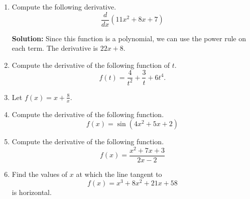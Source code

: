 \documentclass{article}
\begin{document}
\ActivityTitle[class=Calculus I, number=3, name=Differentiation I (Solutions)]

\begin{enumerate}
\item Compute the following derivative. \[ \frac{d}{dx} \left( 11 x^2 + 8 x + 7 \right) \]

\textbf{Solution:}
Since this function is a polynomial, we can use the power rule on each term. The derivative is $22 x + 8$.

  
\vspace{1cm}

\item Compute the derivative of the following function of $t$. \[ f(t) = \frac{4}{t^{2}} + \frac{3}{t} + 6 t^{4}. \]

  
\vspace{1cm}

\item Let $f(x) = x + \frac{8}{x}$.

  
\vspace{1cm}

\item Compute the derivative of the following function. \[ f(x) = \sin(4 x^2 + 5 x + 2) \]

  
\vspace{1cm}

\item Compute the derivative of the following function. \[ f(x) = \frac{x^2 + 7 x + 3}{2 x - 2} \]

  
\vspace{1cm}

\item Find the values of $x$ at which the line tangent to \[ f(x) = x^3 + 8 x^2 + 21 x + 58 \] is horizontal.

  
\vspace{1cm}
\end{enumerate}
\end{document}
